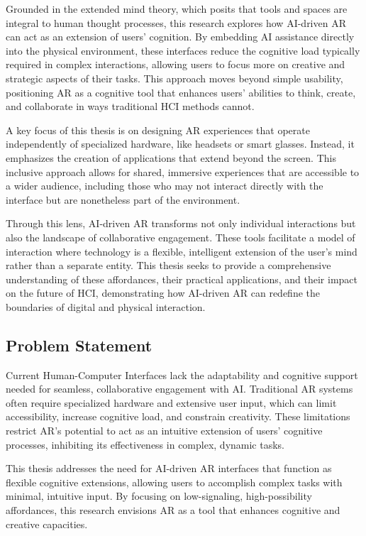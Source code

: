 Grounded in the extended mind theory\cite{andy1998extended}, which posits that tools and spaces are integral to human thought processes, this research explores how AI-driven AR can act as an extension of users’ cognition.
By embedding AI assistance directly into the physical environment, these interfaces reduce the cognitive load typically required in complex interactions, allowing users to focus more on creative and strategic aspects of their tasks.
This approach moves beyond simple usability, positioning AR as a cognitive tool that enhances users' abilities to think, create, and collaborate in ways traditional HCI methods cannot.

A key focus of this thesis is on designing AR experiences that operate independently of specialized hardware, like headsets or smart glasses.
Instead, it emphasizes the creation of applications that extend beyond the screen.
This inclusive approach allows for shared, immersive experiences that are accessible to a wider audience, including those who may not interact directly with the interface but are nonetheless part of the environment.

Through this lens, AI-driven AR transforms not only individual interactions but also the landscape of collaborative engagement.
These tools facilitate a model of interaction where technology is a flexible, intelligent extension of the user's mind rather than a separate entity.
This thesis seeks to provide a comprehensive understanding of these affordances, their practical applications, and their impact on the future of HCI, demonstrating how AI-driven AR can redefine the boundaries of digital and physical interaction.

\subsection{Problem Statement}

Current Human-Computer Interfaces lack the adaptability and cognitive support needed for seamless, collaborative engagement with AI.
Traditional AR systems often require specialized hardware and extensive user input, which can limit accessibility, increase cognitive load, and constrain creativity.
These limitations restrict AR’s potential to act as an intuitive extension of users' cognitive processes, inhibiting its effectiveness in complex, dynamic tasks.

This thesis addresses the need for AI-driven AR interfaces that function as flexible cognitive extensions, allowing users to accomplish complex tasks with minimal, intuitive input.
By focusing on low-signaling, high-possibility affordances, this research envisions AR as a tool that enhances cognitive and creative capacities.%


